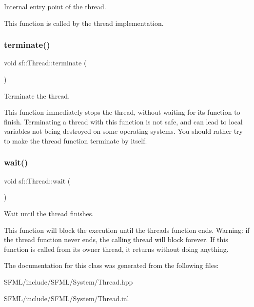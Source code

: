 Internal entry point of the thread. 

This function is called by the thread implementation. \begin{DoxyVerb}\end{DoxyVerb}
 \mbox{\label{classsf_1_1_thread_ad6b205d4f1ce38b8d44bba0f5501477c}} 
\subsubsection{\texorpdfstring{terminate()}{terminate()}}
{\footnotesize\ttfamily void sf\+::\+Thread\+::terminate (\begin{DoxyParamCaption}{ }\end{DoxyParamCaption})}



Terminate the thread. 

This function immediately stops the thread, without waiting for its function to finish. Terminating a thread with this function is not safe, and can lead to local variables not being destroyed on some operating systems. You should rather try to make the thread function terminate by itself. \begin{DoxyVerb}\end{DoxyVerb}
 \mbox{\label{classsf_1_1_thread_a724b1f94c2d54f84280f2f78bde95fa0}} 
\subsubsection{\texorpdfstring{wait()}{wait()}}
{\footnotesize\ttfamily void sf\+::\+Thread\+::wait (\begin{DoxyParamCaption}{ }\end{DoxyParamCaption})}



Wait until the thread finishes. 

This function will block the execution until the thread\textquotesingle{}s function ends. Warning\+: if the thread function never ends, the calling thread will block forever. If this function is called from its owner thread, it returns without doing anything. \begin{DoxyVerb}\end{DoxyVerb}
 

The documentation for this class was generated from the following files\+:\begin{DoxyCompactItemize}
\item 
S\+F\+M\+L/include/\+S\+F\+M\+L/\+System/Thread.\+hpp\item 
S\+F\+M\+L/include/\+S\+F\+M\+L/\+System/Thread.\+inl\end{DoxyCompactItemize}
